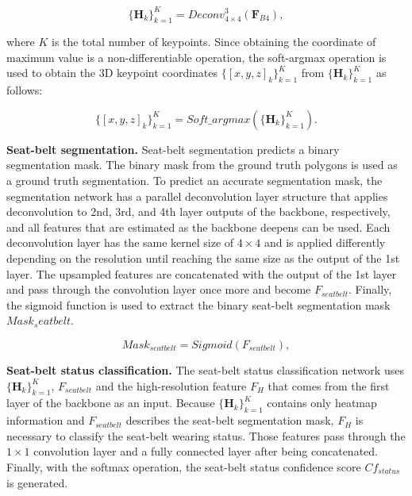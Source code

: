 \documentclass[letterpaper]{article} %
\begin{document}
\begin{equation} \label{1}
{\{{\mathbf H}_{k}\}_{k=1}^{K} = Deconv_{4\times4}^{3}(\textbf{F}_{B4})},
\end{equation}

\noindent where $K$ is the total number of keypoints. Since obtaining the coordinate of maximum value is a non-differentiable operation, the soft-argmax operation is used to obtain the 3D keypoint coordinates $\{[{x}, {y}, {z}]_{k}\}_{k=1}^{K}$ from $\{{\mathbf H}_{k}\}_{k=1}^{K}$ as follows:

\begin{equation} \label{2}
{\{[{x}, {y}, {z}]_{k}\}_{k=1}^{K} = Soft\_argmax(\{{\mathbf H}_{k}\}_{k=1}^{K})}.
\end{equation}

\textbf{Seat-belt segmentation.} Seat-belt segmentation predicts a binary segmentation mask. The binary mask from the ground truth polygons is used as a ground truth segmentation. To predict an accurate segmentation mask, the segmentation network has a parallel deconvolution layer structure that applies deconvolution to 2nd, 3rd, and 4th layer outputs of the backbone, respectively, and all features that are estimated as the backbone deepens can be used. Each deconvolution layer has the same kernel size of $4\times4$ and is applied differently depending on the resolution until reaching the same size as the output of the 1st layer. The upsampled features are concatenated with the output of the 1st layer and pass through the convolution layer once more and become ${F}_{seatbelt}$. Finally, the sigmoid function is used to extract the binary seat-belt segmentation mask ${Mask}_seatbelt$.

\begin{equation} \label{3}
{{Mask}_{seatbelt} = Sigmoid({F}_{seatbelt})},
\end{equation}

\textbf{Seat-belt status classification.} The seat-belt status classification network uses $\{{\mathbf H}_{k}\}_{k=1}^{K}$, ${F}_{seatbelt}$ and the high-resolution feature ${F}_{H}$ that comes from the first layer of the backbone as an input. Because $\{{\mathbf H}_{k}\}_{k=1}^{K}$ contains only heatmap information and  ${F}_{seatbelt}$ describes the seat-belt segmentation mask, ${F}_{H}$ is necessary to classify the seat-belt wearing status. Those features pass through the $1\times1$ convolution layer and a fully connected layer after being concatenated. Finally, with the softmax operation, the seat-belt status confidence score ${Cf}_{status}$ is generated.
\end{document}
